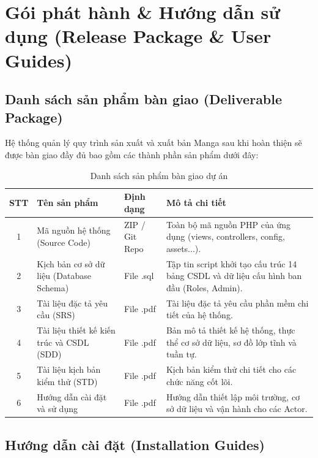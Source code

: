 \chapter{Gói phát hành \& Hướng dẫn sử dụng (Release Package \& User Guides)}
\label{ch:release}

\section{Danh sách sản phẩm bàn giao (Deliverable Package)}
\label{sec:release_package}
Hệ thống quản lý quy trình sản xuất và xuất bản Manga sau khi hoàn thiện sẽ được bàn giao đầy đủ bao gồm các thành phần sản phẩm dưới đây:

\begin{table}[H]
\centering
\renewcommand{\arraystretch}{1.3}
\begin{tabularx}{\textwidth}{|c|l|l|>{\raggedright\arraybackslash}X|}
\hline
\rowcolor{tableheader}
\textbf{STT} & \textbf{Tên sản phẩm} & \textbf{Định dạng} & \textbf{Mô tả chi tiết} \\ \hline
1 & Mã nguồn hệ thống (Source Code) & ZIP / Git Repo & Toàn bộ mã nguồn PHP của ứng dụng (views, controllers, config, assets...). \\ \hline
2 & Kịch bản cơ sở dữ liệu (Database Schema) & File .sql & Tập tin script khởi tạo cấu trúc 14 bảng CSDL và dữ liệu cấu hình ban đầu (Roles, Admin). \\ \hline
3 & Tài liệu đặc tả yêu cầu (SRS) & File .pdf & Tài liệu đặc tả yêu cầu phần mềm chi tiết của hệ thống. \\ \hline
4 & Tài liệu thiết kế kiến trúc và CSDL (SDD) & File .pdf & Bản mô tả thiết kế hệ thống, thực thể cơ sở dữ liệu, sơ đồ lớp tĩnh và tuần tự. \\ \hline
5 & Tài liệu kịch bản kiểm thử (STD) & File .pdf & Kịch bản kiểm thử chi tiết cho các chức năng cốt lõi. \\ \hline
6 & Hướng dẫn cài đặt và sử dụng & File .pdf & Hướng dẫn thiết lập môi trường, cơ sở dữ liệu và vận hành cho các Actor. \\ \hline
\end{tabularx}
\caption{Danh sách sản phẩm bàn giao dự án}
\label{tab:deliverables}
\end{table}

\section{Hướng dẫn cài đặt (Installation Guides)}
\label{sec:installation_guides}

